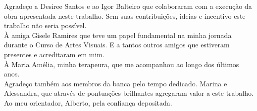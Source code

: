 \begin{agradecimento}

Agradeço a Desiree Santos e ao Igor Balteiro que colaboraram com a execução da obra apresentada neste trabalho. Sem suas contribuições, ideias e incentivo este trabalho não seria possível.\\

À amiga Gisele Ramires que teve um papel fundamental na minha jornada durante o Curso de Artes Visuais. E a tantos outros amigos que estiveram presentes e acreditaram em mim.\\


À Maria Amélia, minha terapeura, que me acompanhou ao longo dos últimos anos.\\


Agradeço também aos membros da banca pelo tempo dedicado. Marina e Alessandra, que através de pontuações brilhantes agregaram valor a este trabalho. \\


Ao meu orientador, Alberto, pela confiança depositada.\\

\end{agradecimento}
